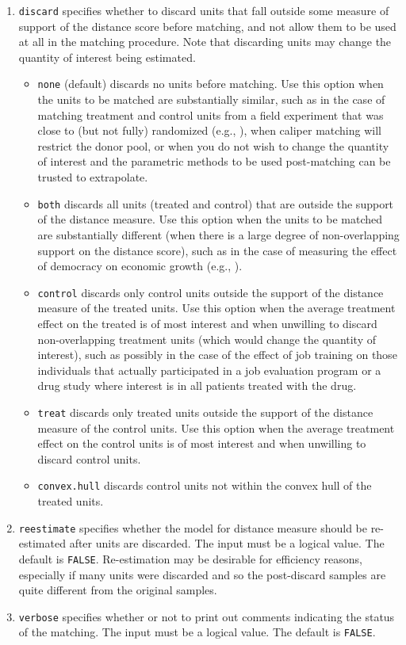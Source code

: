 \documentclass[oneside,letterpaper,titlepage]{article}
\begin{document}
\begin{enumerate}
\item \texttt{discard} specifies whether to discard units that fall
  outside some measure of support of the distance score before
  matching, and not allow them to be used at all in the matching
  procedure.  Note that discarding units may change the quantity of
  interest being estimated.
  \begin{itemize}
  \item \texttt{none} (default) discards no units before matching.
    Use this option when the units to be matched are substantially
    similar, such as in the case of matching treatment and control
    units from a field experiment that was close to (but not fully)
    randomized (e.g., \citealt{Imai05}), when caliper matching will
    restrict the donor pool, or when you do not wish to change the
    quantity of interest and the parametric methods to be used
    post-matching can be trusted to extrapolate.
   \item \texttt{both} discards all units (treated and control) that
     are outside the support of the distance measure. Use this option
     when the units to be matched are substantially different (when
     there is a large degree of non-overlapping support on the
     distance score), such as in the case of measuring the effect of
     democracy on economic growth (e.g., \citealt{KinZen04}).
   \item \texttt{control} discards only control units outside the
     support of the distance measure of the treated units.  Use this
     option when the average treatment effect on the treated is of
     most interest and when unwilling to discard non-overlapping
     treatment units (which would change the quantity of interest),
     such as possibly in the case of the effect of job training on
     those individuals that actually participated in a job evaluation
     program or a drug study where interest is in all patients treated
     with the drug.
   \item \texttt{treat} discards only treated units outside the
     support of the distance measure of the control units.  Use this
     option when the average treatment effect on the control units is
     of most interest and when unwilling to discard control units.
   \item \texttt{convex.hull} discards control units not within the
     convex hull of the treated units. 
  \end{itemize}
  
\item \texttt{reestimate} specifies whether the model for distance
  measure should be re-estimated after units are discarded. The input
  must be a logical value. The default is \texttt{FALSE}.
  Re-estimation may be desirable for efficiency reasons, especially if
  many units were discarded and so the post-discard samples are quite
  different from the original samples.

\item \texttt{verbose} specifies whether or not to print out comments
  indicating the status of the matching. The input must be a logical
  value. The default is \texttt{FALSE}.
\end{enumerate}
\end{document}
